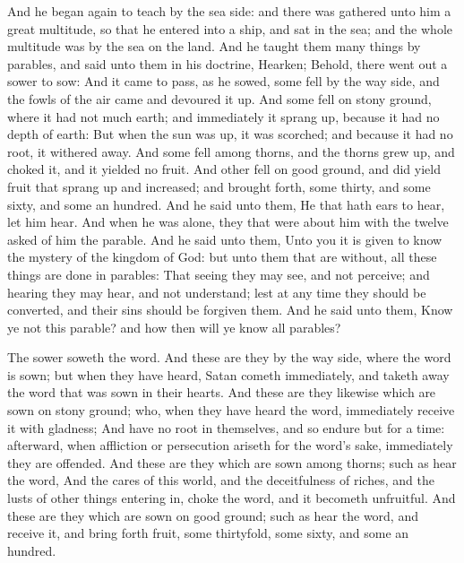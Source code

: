  And he began again to teach by the sea side: and there
was gathered unto him a great multitude, so that he entered into a ship,
and sat in the sea; and the whole multitude was by the sea on the land.
 And he taught them many things by parables, and said unto
them in his doctrine,  Hearken; Behold, there went out a
sower to sow:  And it came to pass, as he sowed, some fell
by the way side, and the fowls of the air came and devoured it up.
 And some fell on stony ground, where it had not much
earth; and immediately it sprang up, because it had no depth of earth:
 But when the sun was up, it was scorched; and because it
had no root, it withered away.  And some fell among
thorns, and the thorns grew up, and choked it, and it yielded no fruit.
 And other fell on good ground, and did yield fruit that
sprang up and increased; and brought forth, some thirty, and some sixty,
and some an hundred.  And he said unto them, He that hath
ears to hear, let him hear.  And when he was alone, they
that were about him with the twelve asked of him the parable.
 And he said unto them, Unto you it is given to know the
mystery of the kingdom of God: but unto them that are without, all these
things are done in parables:  That seeing they may see,
and not perceive; and hearing they may hear, and not understand; lest at
any time they should be converted, and their sins should be forgiven
them.  And he said unto them, Know ye not this parable?
and how then will ye know all parables?

 The sower soweth the word.  And these are
they by the way side, where the word is sown; but when they have heard,
Satan cometh immediately, and taketh away the word that was sown in
their hearts.  And these are they likewise which are sown
on stony ground; who, when they have heard the word, immediately receive
it with gladness;  And have no root in themselves, and so
endure but for a time: afterward, when affliction or persecution ariseth
for the word's sake, immediately they are offended.  And
these are they which are sown among thorns; such as hear the word,
 And the cares of this world, and the deceitfulness of
riches, and the lusts of other things entering in, choke the word, and
it becometh unfruitful.  And these are they which are
sown on good ground; such as hear the word, and receive it, and bring
forth fruit, some thirtyfold, some sixty, and some an hundred.

